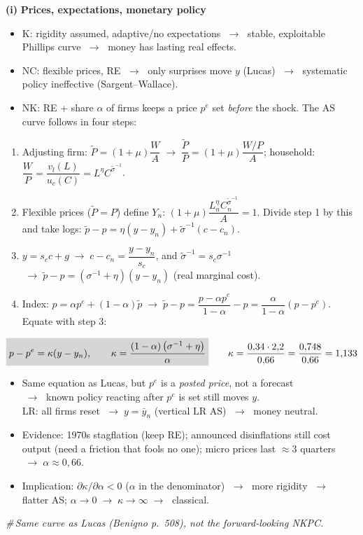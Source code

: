 \documentclass[11pt, a4paper]{article}
\newcommand{\res}[1]{\colorbox{hl}{$\displaystyle #1$}}
\newcommand{\rest}[1]{\colorbox{hl}{#1}}
\newcommand{\nota}[1]{\par\hfill\textcolor{margem}{\small\itshape\#\,#1}\par}
\newcommand{\itm}[1]{\par\smallskip\needspace{3\baselineskip}\noindent\textbf{(#1)}\quad}
\newcommand{\ra}{\;\rightarrow\;}
\newcommand{\Sg}{\left(\sigma^{-1}+\eta\right)}
\begin{document}
\itm{i} \textbf{Prices, expectations, monetary policy}
\begin{itemize}
\item K: rigidity assumed, adaptive/no expectations $\ra$ stable, exploitable Phillips
      curve $\ra$ money has lasting real effects.
\item NC: flexible prices, RE $\ra$ only surprises move $y$ (Lucas) $\ra$ systematic policy
      ineffective (Sargent--Wallace).
\item NK: RE + share $\alpha$ of firms keeps a price $p^e$ set \emph{before} the shock. The AS
      curve follows in four steps:
\end{itemize}
\begin{enumerate}[label=\arabic*., leftmargin=2.2em]
\item Adjusting firm: $\tilde P=(1+\mu)\dfrac{W}{A}\ra\dfrac{\tilde P}{P}=(1+\mu)\dfrac{W/P}{A}$;
      household: $\dfrac WP=\dfrac{v_l(L)}{u_c(C)}=L^{\eta}C^{\tilde\sigma^{-1}}$.
\item Flexible prices ($\tilde P=P$) define $Y_n$: $(1+\mu)\dfrac{L_n^{\eta}C_n^{\tilde\sigma^{-1}}}{A}=1$.
      Divide step 1 by this and take logs:
      $\tilde p-p=\eta(y-y_n)+\tilde\sigma^{-1}(c-c_n)$.
\item $y=s_c c+g\ra c-c_n=\dfrac{y-y_n}{s_c}$, and $\tilde\sigma^{-1}=s_c\sigma^{-1}$
      $\ra\tilde p-p=\Sg(y-y_n)$ \quad(real marginal cost).
\item Index: $p=\alpha p^e+(1-\alpha)\tilde p\ra\tilde p-p=\dfrac{p-\alpha p^e}{1-\alpha}-p
      =\dfrac{\alpha}{1-\alpha}(p-p^e)$. Equate with step 3:
\end{enumerate}
\[
\res{p-p^e=\kappa(y-y_n),\qquad \kappa=\frac{(1-\alpha)\Sg}{\alpha}}
\qquad \kappa=\frac{0{,}34\cdot2{,}2}{0{,}66}=\frac{0{,}748}{0{,}66}=1{,}133
\]
\begin{itemize}
\item Same equation as Lucas, but $p^e$ is a \emph{posted price}, not a forecast\\
      $\ra$ \rest{known policy reacting after $p^e$ is set still moves $y$}.\\
      LR: all firms reset $\ra y=\bar y_n$ (vertical LR AS) $\ra$ money neutral.
\item Evidence: 1970s stagflation (keep RE); announced disinflations still cost output
      (need a friction that fools no one); micro prices last $\approx3$ quarters
      $\ra\alpha\approx0{,}66$.
\item Implication: $\partial\kappa/\partial\alpha<0$ ($\alpha$ in the denominator)
      $\ra$ more rigidity $\ra$ flatter AS; $\alpha\to0\ra\kappa\to\infty\ra$ classical.
\end{itemize}
\nota{Same curve as Lucas (Benigno p.~508), not the forward-looking NKPC.}
\end{document}
